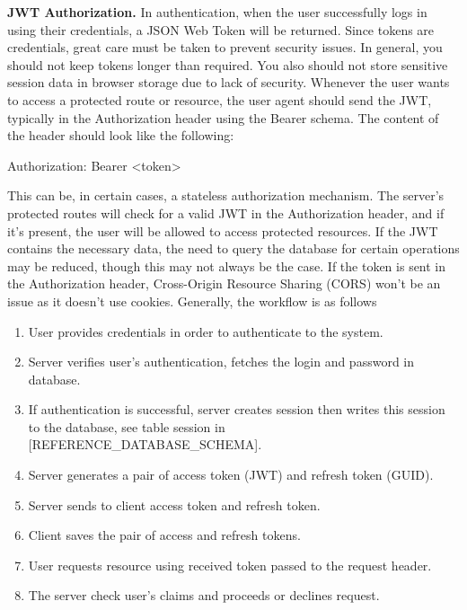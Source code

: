 \textbf{JWT Authorization.} In authentication, when the user successfully logs in using their credentials, a JSON Web Token will be returned.
Since tokens are credentials, great care must be taken to prevent security issues.
In general, you should not keep tokens longer than required.
You also should not store sensitive session data in browser storage due to lack of security.
Whenever the user wants to access a protected route or resource, the user agent should send the JWT,
typically in the Authorization header using the Bearer schema.
The content of the header should look like the following:
\begin{spverbatim}

    Authorization: Bearer <token>

\end{spverbatim}
This can be, in certain cases, a stateless authorization mechanism.
The server's protected routes will check for a valid JWT in the Authorization header, and if it's present,
the user will be allowed to access protected resources.
If the JWT contains the necessary data, the need to query the database for certain operations may be reduced,
though this may not always be the case.
If the token is sent in the Authorization header, Cross-Origin Resource Sharing (CORS) won't be an issue
as it doesn't use cookies.
Generally, the workflow is as follows
\begin{enumerate}
    \item User provides credentials in order to authenticate to the system.
    \item Server verifies user's authentication, fetches the login and password in database.
    \item If authentication is successful, server creates session then writes this session to the database,
    see table session in [REFERENCE\_DATABASE\_SCHEMA].
    \item Server generates a pair of access token (JWT) and refresh token (GUID).
    \item Server sends to client access token and refresh token.
    \item Client saves the pair of access and refresh tokens.
    \item User requests resource using received token passed to the request header.
    \item The server check user's claims and proceeds or declines request.
\end{enumerate}

